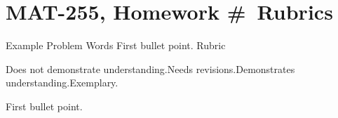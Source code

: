 \documentclass[letterpaper, 11 pt]{../ximera}
\begin{document}
\chapter{MAT-255, Homework \#\homework\ Rubrics}

\begin{ex}{Example Problem}
    Words
    First bullet point.
    Rubric
            
                Does not demonstrate understanding.Needs revisions.Demonstrates understanding.Exemplary.
\end{ex}
\begin{enumerate}[(a)]
    First bullet point.
\end{enumerate}
\end{document}
